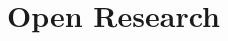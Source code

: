 \documentclass[draft]{agujournal2019}
\begin{document}


%
%
%
%

%
%

%

%


\section{Open Research}
\end{document}
